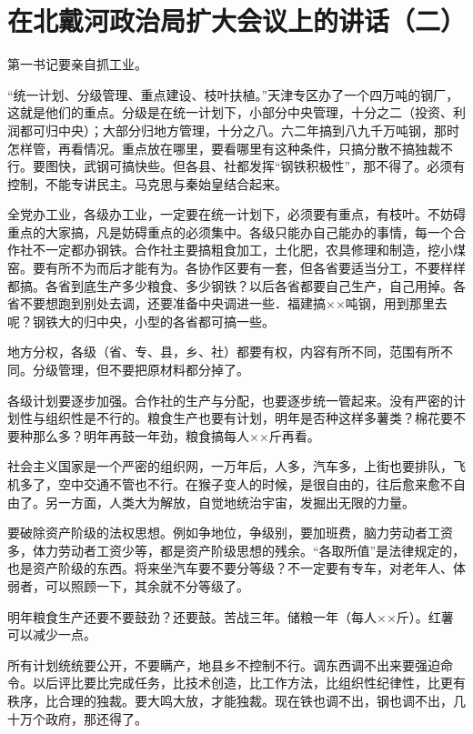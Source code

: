 \section[在北戴河政治局扩大会议上的讲话（二）（一九五八年八月十九日）]{在北戴河政治局扩大会议上的讲话（二）}


第一书记要亲自抓工业。

“统一计划、分级管理、重点建设、枝叶扶植。”天津专区办了一个四万吨的钢厂，这就是他们的重点。分级是在统一计划下，小部分中央管理，十分之二（投资、利润都可归中央）；大部分归地方管理，十分之八。六二年搞到八九千万吨钢，那时怎样管，再看情况。重点放在哪里，要看哪里有这种条件，只搞分散不搞独裁不行。要图快，武钢可搞快些。但各县、社都发挥“钢铁积极性”，那不得了。必须有控制，不能专讲民主。马克思与秦始皇结合起来。

全党办工业，各级办工业，一定要在统一计划下，必须要有重点，有枝叶。不妨碍重点的大家搞，凡是妨碍重点的必须集中。各级只能办自己能办的事情，每一个合作社不一定都办钢铁。合作社主要搞粗食加工，土化肥，农具修理和制造，挖小煤窑。要有所不为而后才能有为。各协作区要有一套，但各省要适当分工，不要样样都搞。各省到底生产多少粮食、多少钢铁？以后各省都要自己生产，自己用掉。各省不要想跑到别处去调，还要准备中央调进一些．福建搞××吨钢，用到那里去呢？钢铁大的归中央，小型的各省都可搞一些。

地方分权，各级（省、专、县，乡、社）都要有权，内容有所不同，范围有所不同。分级管理，但不要把原材料都分掉了。

各级计划要逐步加强。合作社的生产与分配，也要逐步统一管起来。没有严密的计划性与组织性是不行的。粮食生产也要有计划，明年是否种这样多薯类？棉花要不要种那么多？明年再鼓一年劲，粮食搞每人××斤再看。

社会主义国家是一个严密的组织网，一万年后，人多，汽车多，上街也要排队，飞机多了，空中交通不管也不行。在猴子变人的时候，是很自由的，往后愈来愈不自由了。另一方面，人类大为解放，自觉地统治宇宙，发掘出无限的力量。

要破除资产阶级的法权思想。例如争地位，争级别，要加班费，脑力劳动者工资多，体力劳动者工资少等，都是资产阶级思想的残余。“各取所值”是法律规定的，也是资产阶级的东西。将来坐汽车要不要分等级？不一定要有专车，对老年人、体弱者，可以照顾一下，其余就不分等级了。

明年粮食生产还要不要鼓劲？还要鼓。苦战三年。储粮一年（每人××斤）。红薯可以减少一点。

所有计划统统要公开，不要瞒产，地县乡不控制不行。调东西调不出来要强迫命令。以后评比要比完成任务，比技术创造，比工作方法，比组织性纪律性，比更有秩序，比合理的独裁。要大鸣大放，才能独裁。现在铁也调不出，钢也调不出，几十万个政府，那还得了。

